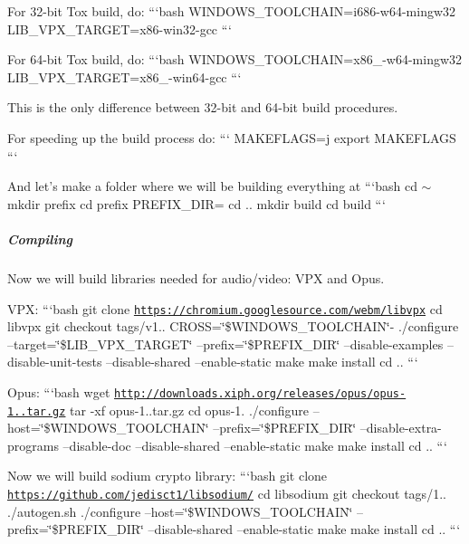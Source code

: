 For 32-\/bit Tox build, do\+: ```bash W\+I\+N\+D\+O\+W\+S\+\_\+\+T\+O\+O\+L\+C\+H\+A\+I\+N=i686-\/w64-\/mingw32 L\+I\+B\+\_\+\+V\+P\+X\+\_\+\+T\+A\+R\+G\+E\+T=x86-\/win32-\/gcc ```

For 64-\/bit Tox build, do\+: ```bash W\+I\+N\+D\+O\+W\+S\+\_\+\+T\+O\+O\+L\+C\+H\+A\+I\+N=x86\+\_-\/w64-\/mingw32 L\+I\+B\+\_\+\+V\+P\+X\+\_\+\+T\+A\+R\+G\+E\+T=x86\+\_-\/win64-\/gcc ```

This is the only difference between 32-\/bit and 64-\/bit build procedures.

For speeding up the build process do\+: ``` M\+A\+K\+E\+F\+L\+A\+G\+S=j export M\+A\+K\+E\+F\+L\+A\+G\+S ```

And let's make a folder where we will be building everything at ```bash cd $\sim$ mkdir prefix cd prefix P\+R\+E\+F\+I\+X\+\_\+\+D\+I\+R= cd .. mkdir build cd build ```

\label{_windows-cross-compile-compiling}%
 \subparagraph*{Compiling}

Now we will build libraries needed for audio/video\+: V\+P\+X and Opus.

V\+P\+X\+: ```bash git clone \href{https://chromium.googlesource.com/webm/libvpx}{\tt https\+://chromium.\+googlesource.\+com/webm/libvpx} cd libvpx git checkout tags/v1.. C\+R\+O\+S\+S=\char`\"{}\$\+W\+I\+N\+D\+O\+W\+S\+\_\+\+T\+O\+O\+L\+C\+H\+A\+I\+N\char`\"{}-\/ ./configure --target=\char`\"{}\$\+L\+I\+B\+\_\+\+V\+P\+X\+\_\+\+T\+A\+R\+G\+E\+T\char`\"{} --prefix=\char`\"{}\$\+P\+R\+E\+F\+I\+X\+\_\+\+D\+I\+R\char`\"{} --disable-\/examples --disable-\/unit-\/tests --disable-\/shared --enable-\/static make make install cd .. ```

Opus\+: ```bash wget \href{http://downloads.xiph.org/releases/opus/opus-1.1.tar.gz}{\tt http\+://downloads.\+xiph.\+org/releases/opus/opus-\/1..\+tar.\+gz} tar -\/xf opus-\/1..\+tar.\+gz cd opus-\/1. ./configure --host=\char`\"{}\$\+W\+I\+N\+D\+O\+W\+S\+\_\+\+T\+O\+O\+L\+C\+H\+A\+I\+N\char`\"{} --prefix=\char`\"{}\$\+P\+R\+E\+F\+I\+X\+\_\+\+D\+I\+R\char`\"{} --disable-\/extra-\/programs --disable-\/doc --disable-\/shared --enable-\/static make make install cd .. ```

Now we will build sodium crypto library\+: ```bash git clone \href{https://github.com/jedisct1/libsodium/}{\tt https\+://github.\+com/jedisct1/libsodium/} cd libsodium git checkout tags/1.. ./autogen.sh ./configure --host=\char`\"{}\$\+W\+I\+N\+D\+O\+W\+S\+\_\+\+T\+O\+O\+L\+C\+H\+A\+I\+N\char`\"{} --prefix=\char`\"{}\$\+P\+R\+E\+F\+I\+X\+\_\+\+D\+I\+R\char`\"{} --disable-\/shared --enable-\/static make make install cd .. ```

